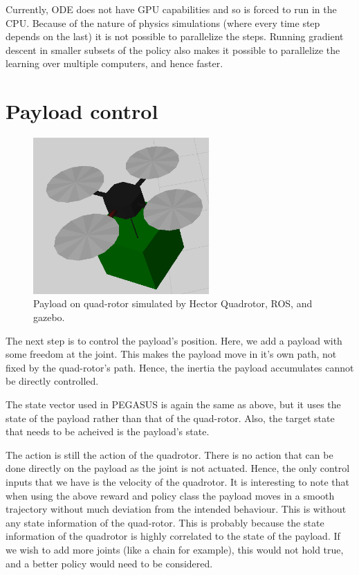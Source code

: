 \documentclass[BTech]{iitmdiss}
\begin{document}
Currently, ODE does not have GPU capabilities and so is forced to run in the CPU. Because of the nature of physics simulations (where every time step depends on the last) it is not possible to parallelize the steps. Running gradient descent in smaller subsets of the policy also makes it possible to parallelize the learning over multiple computers, and hence faster.

\section{Payload control}

\begin{figure}[h]
  \centering
    \includegraphics[width=0.6\textwidth]{quadrotor_payload_sim.png}
    \caption{Payload on quad-rotor simulated by Hector Quadrotor, ROS, and gazebo.}
\end{figure}

The next step is to control the payload's position. Here, we add a payload with some freedom at the joint. This makes the payload move in it's own path, not fixed by the quad-rotor's path. Hence, the inertia the payload accumulates cannot be directly controlled.

The state vector used in PEGASUS is again the same as above, but it uses the state of the payload rather than that of the quad-rotor. Also, the target state that needs to be acheived is the payload's state.

The action is still the action of the quadrotor. There is no action that can be done directly on the payload as the joint is not actuated. Hence, the only control inputs that we have is the velocity of the quadrotor. It is interesting to note that when using the above reward and policy class the payload moves in a smooth trajectory without much deviation from the intended behaviour. This is without any state information of the quad-rotor. This is probably because the state information of the quadrotor is highly correlated to the state of the payload. If we wish to add more joints (like a chain for example), this would not hold true, and a better policy would need to be considered.
\end{document}
